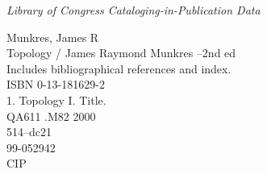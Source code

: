 \newpage
\thispagestyle{empty}
\setlength{\parindent}{0pt}
\setlength{\parskip}{0.3\baselineskip} %
\small %

\begin{flushleft}
\textit
{
    Library of Congress Cataloging-in-Publication Data
}

\vspace{0.3\baselineskip}

{\ttfamily
\noindent Munkres, James R \\ %

\noindent \hspace{2em} Topology / James Raymond Munkres --2nd ed \\
\hspace{2em} Includes bibliographical references and index. \\
\hspace{2em} ISBN 0-13-181629-2 \\
\hspace{2em} 1. Topology I. Title. \\

\noindent \hspace{1em} QA611 .M82 2000 \\
\noindent \hspace{1em} 514--dc21 \\

\noindent \hspace{15em} 99-052942 \\ %

\noindent \hspace{16em} CIP %
}


\vspace{0.5\baselineskip}
\end{flushleft}

